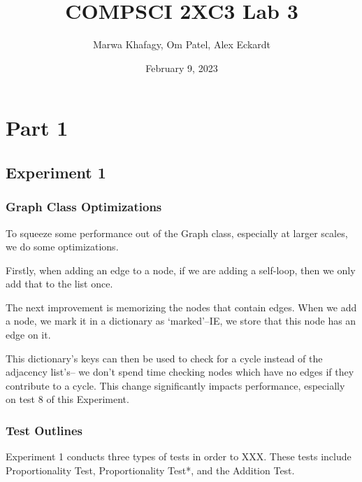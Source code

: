 \documentclass[12pt]{article}
\title{COMPSCI 2XC3 Lab 3}
\author{Marwa Khafagy, Om Patel, Alex Eckardt}
\date{February 9, 2023}
\begin{document}
\maketitle

\newpage
\tableofcontents

\newpage
\listoffigures


%
%
%
%
\newpage
\section{Part 1}
\subsection{Experiment 1}

\subsubsection{Graph Class Optimizations}

To squeeze some performance out of the Graph class, especially at larger scales, we do some optimizations.

Firstly, when adding an edge to a node, if we are adding a self-loop, then we only add that to the list once.

The next improvement is memorizing the nodes that contain edges. When we add a node, we mark it in a dictionary as `marked'--IE, we store that this node has an edge on it.

This dictionary's keys can then be used to check for a cycle instead of the adjacency list's-- we don't spend time checking nodes which have no edges if they contribute to a cycle. This change significantly impacts performance, especially on test 8 of this Experiment.

\subsubsection{Test Outlines}

Experiment 1 conducts three types of tests in order to XXX\@. These tests include Proportionality Test, Proportionality Test*, and the Addition Test.
\end{document}
